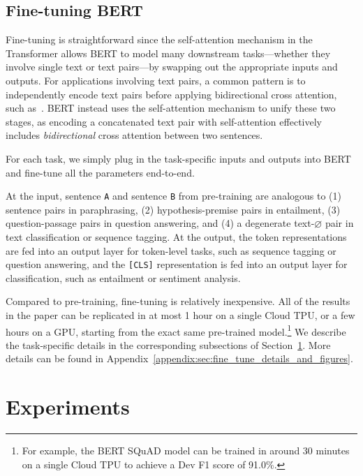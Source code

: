 \subsection{Fine-tuning BERT}
\label{sec:finetuning_procedure}

Fine-tuning is straightforward since the self-attention mechanism in the Transformer allows BERT to model many downstream tasks---whether they involve single text or text pairs---by swapping out the appropriate inputs and outputs. For applications involving text pairs, a common pattern is to independently encode text pairs before applying bidirectional cross attention, such as~. BERT instead uses the self-attention mechanism to unify these two stages, as encoding a concatenated text pair with self-attention effectively includes \emph{bidirectional} cross attention between two sentences. 

For each task, we simply plug in the task-specific inputs and outputs into BERT and fine-tune all the parameters end-to-end. 

At the input, sentence {\tt A} and sentence {\tt B} from pre-training are analogous to (1) sentence pairs in paraphrasing, (2) hypothesis-premise pairs in entailment, (3) question-passage pairs in question answering, and (4) a degenerate text-$\varnothing$ pair in text classification or sequence tagging. At the output, the token representations are fed into an output layer for token-level tasks, such as sequence tagging or question answering, and the {\tt [CLS]} representation is fed into an output layer for classification, such as entailment or sentiment analysis.

Compared to pre-training, fine-tuning is relatively inexpensive. All of the results in the paper can be replicated in at most 1 hour on a single Cloud TPU, or a few hours on a GPU, starting from the exact same pre-trained model.\footnote{For example, the BERT SQuAD model can be trained in around 30 minutes on a single Cloud TPU to achieve a Dev F1 score of 91.0\%.}
We describe the task-specific details in the corresponding subsections of Section~\ref{sec:experiments}. 
More details can be found in Appendix~\ref{appendix:sec:fine_tune_details_and_figures}.

\ignorespaces

\ignorespaces


\section{Experiments}
\label{sec:experiments}

